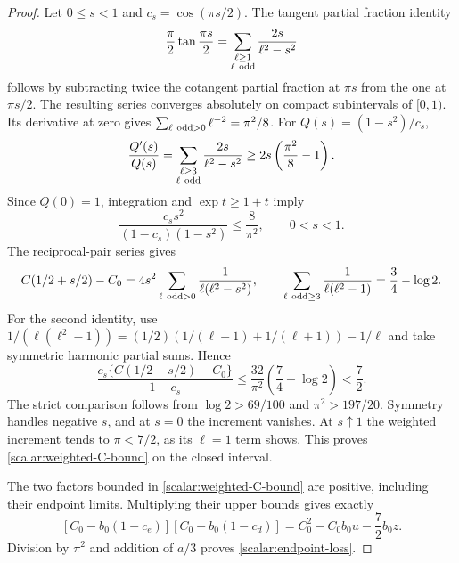 \begin{proof}
Let $0\leq s<1$ and $c_s=\cos(\pi s/2)$.  The tangent partial
fraction identity
\[
 \frac\pi2\tan\frac{\pi s}{2}
 =\sum_{\substack{\ell\geq1\\\ell\ {\rm odd}}}
       \frac{2s}{\ell^2-s^2}
\]
follows by subtracting twice the cotangent partial fraction at $\pi s$
from the one at $\pi s/2$.  The resulting series converges absolutely
on compact subintervals of $[0,1)$.  Its derivative at zero gives
$\sum_{\ell\ {\rm odd}>0}\ell^{-2}=\pi^2/8$.
For $Q(s)=(1-s^2)/c_s$,
\[
 \frac{Q'(s)}{Q(s)}=
 \sum_{\substack{\ell\geq3\\\ell\ {\rm odd}}}
       \frac{2s}{\ell^2-s^2}
 \geq2s\left(\frac{\pi^2}{8}-1\right).
\]
Since $Q(0)=1$, integration and $\exp t\geq1+t$ imply
\[
 \frac{c_ss^2}{(1-c_s)(1-s^2)}\leq\frac8{\pi^2},
 \qquad 0<s<1.
\]
The reciprocal-pair series gives
\[
 C(1/2+s/2)-C_0
 =4s^2\sum_{\ell\ {\rm odd}>0}\frac1{\ell(\ell^2-s^2)},
 \qquad
 \sum_{\ell\ {\rm odd}\geq3}\frac1{\ell(\ell^2-1)}
 =\frac34-\log2.
\]
For the second identity, use
$1/(\ell(\ell^2-1))=(1/2)(1/(\ell-1)+1/(\ell+1))-1/\ell$
and take symmetric harmonic partial sums.  Hence
\[
 \frac{c_s\{C(1/2+s/2)-C_0\}}{1-c_s}
 \leq\frac{32}{\pi^2}\left(\frac74-\log2\right)<\frac72.
\]
The strict comparison follows from $\log2>69/100$ and
$\pi^2>197/20$.  Symmetry handles negative $s$, and at $s=0$ the
increment vanishes.  At $s\uparrow1$ the weighted increment tends
to $\pi<7/2$, as its $\ell=1$ term shows.  This proves
\eqref{scalar:weighted-C-bound} on the closed interval.

The two factors bounded in \eqref{scalar:weighted-C-bound} are
positive, including their endpoint limits.  Multiplying their upper
bounds gives exactly
\[
 [C_0-b_0(1-c_e)][C_0-b_0(1-c_d)]
 =C_0^2-C_0b_0u-\frac72b_0z.
\]
Division by $\pi^2$ and addition of $a/3$ proves
\eqref{scalar:endpoint-loss}.
\end{proof}

